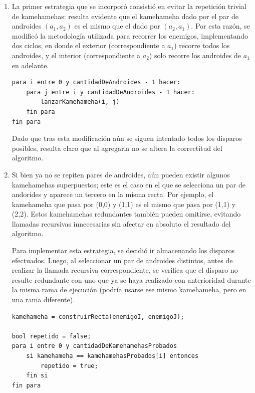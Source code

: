     \begin{enumerate}
        \item La primer estrategia que se incorporó consistió en evitar la repetición trivial de kamehamehas: resulta evidente que el kamehameha dado por el par de androides $(a_1, a_2)$ es el mismo que el dado por $(a_2, a_1)$. Por esta razón, se modificó la metodología utilizada para recorrer los enemigos, implementando dos ciclos, en donde el exterior (correspondiente a $a_1$) recorre todos los androides, y el interior (correspondiente a $a_2$) solo recorre los androides de $a_1$ en adelante.

        \begin{codesnippet}
        \begin{verbatim}
para i entre 0 y cantidadDeAndroides - 1 hacer:
    para j entre i y cantidadDeAndroides - 1 hacer:
        lanzarKamehameha(i, j)
    fin para
fin para
        \end{verbatim}
        \end{codesnippet}

        Dado que tras esta modificación aún se siguen intentado todos los disparos posibles, resulta claro que al agregarla no se altera la correctitud del algoritmo.

        \item Si bien ya no se repiten pares de androides, aún pueden existir algunos kamehamehas superpuestos; este es el caso en el que se selecciona un par de andorides y aparece un tercero en la misma recta. Por ejemplo, el kamehameha que pasa por (0,0) y (1,1) es el mismo que pasa por (1,1) y (2,2). Estos kamehamehas redundantes también pueden omitirse, evitando llamadas recursivas innecesarias sin afectar en absoluto el resultado del algoritmo.

        Para implementar esta estrategia, se decidió ir almacenando los disparos efectuados. Luego, al seleccionar un par de androides distintos, antes de realizar la llamada recursiva correspondiente, se verifica que el disparo no resulte redundante con uno que ya se haya realizado con anterioridad durante la misma rama de ejecución (podría usarse ese mismo kamehameha, pero en una rama diferente).

        \begin{codesnippet}
        \begin{verbatim}
kamehameha = construirRecta(enemigoI, enemigoJ);

bool repetido = false;
para i entre 0 y cantidadDeKamehamehasProbados
    si kamehameha == kamehamehasProbados[i] entonces
        repetido = true;
    fin si
fin para


\end{verbatim}
\end{codesnippet}
\end{enumerate}
